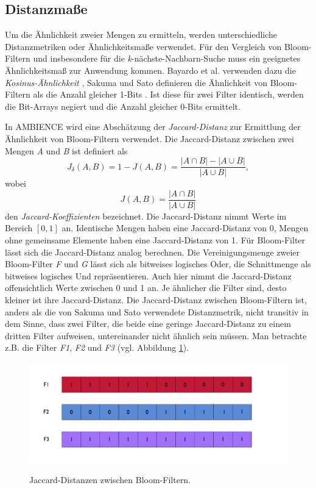 \subsection{Distanzmaße}\label{sec:distanzmasse}
Um die Ähnlichkeit zweier Mengen zu ermitteln, werden unterschiedliche Distanzmetriken oder Ähnlichkeitsmaße verwendet. Für den Vergleich von Bloom-Filtern und insbesondere für die \textit{k}-nächste-Nachbarn-Suche muss ein geeignetes Ähnlichkeitsmaß zur Anwendung kommen. Bayardo et al. verwenden dazu die \textit{Kosinus-Ähnlichkeit} \cite{Bayardo2007}, Sakuma und Sato definieren die Ähnlichkeit von Bloom-Filtern als die Anzahl gleicher 1-Bits \cite{Sakuma2011}. Ist diese für zwei Filter identisch, werden die Bit-Arrays negiert und die Anzahl gleicher 0-Bits ermittelt. 

In AMBIENCE wird eine Abschätzung der \textit{Jaccard-Distanz} zur Ermittlung der Ähnlichkeit von Bloom-Filtern verwendet. Die Jaccard-Distanz zwischen zwei Mengen \textit{A} und \textit{B} ist definiert als 
\[J_{\delta}(A,B) = 1 - J(A,B) = \frac{|A\cap B| - |A\cup B|}{|A\cup B|}, \]
wobei 
\[J(A,B) = \frac{|A\cap B|}{|A\cup B|}\] den \textit{Jaccard-Koeffizienten} bezeichnet. Die Jaccard-Distanz nimmt Werte im Bereich $\left[0,1\right]$ an. Identische Mengen haben eine Jaccard-Distanz von 0, Mengen ohne gemeinsame Elemente haben eine Jaccard-Distanz von 1. 
Für Bloom-Filter lässt sich die Jaccard-Distanz analog berechnen. Die Vereinigungsmenge zweier Bloom-Filter \textit{F} und \textit{G} lässt sich als bitweises logisches Oder, die Schnittmenge als bitweises logisches Und repräsentieren. Auch hier nimmt die Jaccard-Distanz offensichtlich Werte zwischen 0 und 1 an. Je ähnlicher die Filter sind, desto kleiner ist ihre Jaccard-Distanz. 
Die Jaccard-Distanz zwischen Bloom-Filtern ist, anders als die von Sakuma und Sato verwendete Distanzmetrik, nicht transitiv in dem Sinne, dass zwei Filter, die beide eine geringe Jaccard-Distanz zu einem dritten Filter aufweisen, untereinander nicht ähnlich sein müssen. Man betrachte z.B. die Filter \textit{F1}, \textit{F2} und \textit{F3} (vgl. Abbildung \ref{fig:pic1}).  
\begin{figure}
  \centering
  \includegraphics[width=1.0\textwidth]{pictures/filters.png}\\
  \caption[Jaccard-Distanzen zwischen Bloom-Filtern]{Jaccard-Distanzen zwischen Bloom-Filtern.}\label{fig:pic1}
\end{figure}
